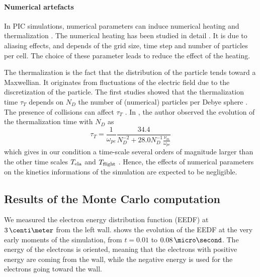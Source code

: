 
    \paragraph{Numerical artefacts \\}
    In PIC simulations, numerical parameters can induce numerical heating and thermalization \citep{lai2014}.
    The numerical heating has been studied in detail \citep{birdsall1991}.
    It is due to aliasing effects, and depends of the grid size, time step and number of particles per cell.
    The choice of these parameter leads to reduce the effect of the heating.

    The thermalization is the fact that the distribution of the particle tends toward a Maxwellian.
    It originates from fluctuations of the electric field due to the discretization of the particle.
    The first studies showed that the thermalization time $\tau_T$ depends on $N_D$ the number of (numerical) particles per Debye sphere \citep{dawson1964,montgomery1970}.
    The presence of collisions can affect $\tau_T$  \citep{turner2006,lai2014}.
    In \citet{turner2006}, the author observed the evolution of the thermalization time with $N_D$ as
    \begin{equation} \label{eq-taut}
      \tau_T = \frac{1}{\omega_{pe}} \frac{34.4}{N_D^{-2} + 28.0 N_D^{-1} \frac{\nu_m}{\omega_{pe}}}
    \end{equation}
    which gives in our condition a time-scale several orders of magnitude larger than the other time scales $T_{\rm ela}$ and $T_{\rm flight}$ .
    Hence, the effects of numerical parameters on the kinetics informations of the simulation are expected to be negligible.


  \subsection{Results of the Monte Carlo computation} \label{subsec-MCMresults}

    We measured the electron energy distribution function (EEDF) at $3\,\centi\meter$ from the left wall.
     shows the evolution of the EEDF at the very early moments of the simulation, from $t=0.01$ to $0.08\,\micro\second$.
    The energy of the electrons is oriented, meaning that the electrons with positive energy are coming from the wall, while the negative energy is used for the electrons going toward the wall.

